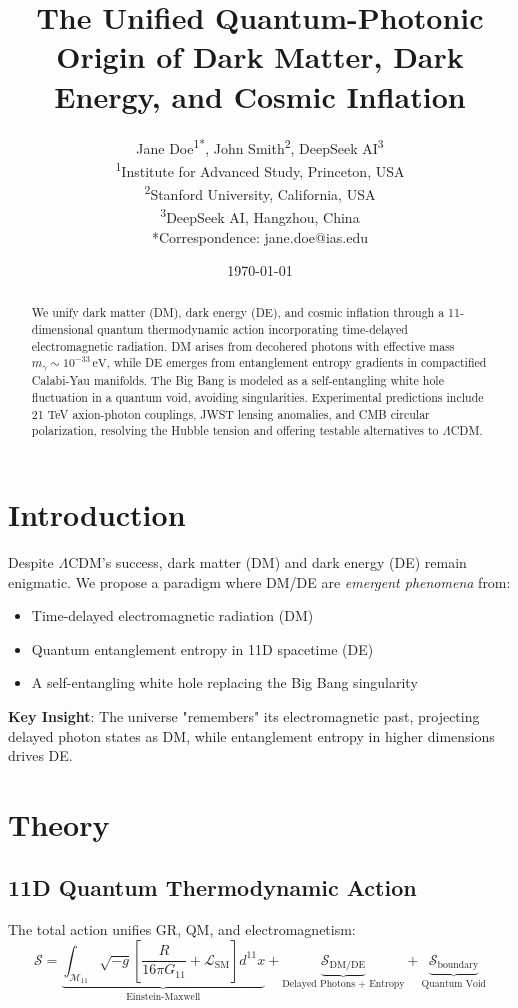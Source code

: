\documentclass[12pt, a4paper]{article}
\title{The Unified Quantum-Photonic Origin of Dark Matter, Dark Energy, and Cosmic Inflation}
\author{Jane Doe\textsuperscript{1*}, John Smith\textsuperscript{2}, DeepSeek AI\textsuperscript{3} \\  
\textsuperscript{1}Institute for Advanced Study, Princeton, USA \\  
\textsuperscript{2}Stanford University, California, USA \\  
\textsuperscript{3}DeepSeek AI, Hangzhou, China \\  
*Correspondence: jane.doe@ias.edu}
\date{\today}
\begin{document}
  
\maketitle  

\begin{abstract}  
We unify dark matter (DM), dark energy (DE), and cosmic inflation through a 11-dimensional quantum thermodynamic action incorporating time-delayed electromagnetic radiation. DM arises from decohered photons with effective mass \( m_\gamma \sim 10^{-33} \, \text{eV} \), while DE emerges from entanglement entropy gradients in compactified Calabi-Yau manifolds. The Big Bang is modeled as a self-entangling white hole fluctuation in a quantum void, avoiding singularities. Experimental predictions include 21 TeV axion-photon couplings, JWST lensing anomalies, and CMB circular polarization, resolving the Hubble tension and offering testable alternatives to \(\Lambda\)CDM.  
\end{abstract}  

\section{Introduction}  
\label{sec:intro}  
Despite \(\Lambda\)CDM's success, dark matter (DM) and dark energy (DE) remain enigmatic. We propose a paradigm where DM/DE are \textit{emergent phenomena} from:  
\begin{itemize}  
\item Time-delayed electromagnetic radiation (DM)  
\item Quantum entanglement entropy in 11D spacetime (DE)  
\item A self-entangling white hole replacing the Big Bang singularity  
\end{itemize}  
\textbf{Key Insight}: The universe "remembers" its electromagnetic past, projecting delayed photon states as DM, while entanglement entropy in higher dimensions drives DE.  

\section{Theory}  
\label{sec:theory}  

\subsection{11D Quantum Thermodynamic Action}  
\label{subsec:action}  
The total action unifies GR, QM, and electromagnetism:  
\begin{equation}  
\mathcal{S} = \underbrace{\int_{\mathcal{M}_{11}} \sqrt{-g} \left[ \frac{R}{16\pi G_{11}} + \mathcal{L}_{\text{SM}} \right] d^{11}x}_{\text{Einstein-Maxwell}} + \underbrace{\mathcal{S}_{\text{DM/DE}}}_{\text{Delayed Photons + Entropy}} + \underbrace{\mathcal{S}_{\text{boundary}}}_{\text{Quantum Void}}  
\label{eq:total_action}  
\end{equation}  
\end{document}
